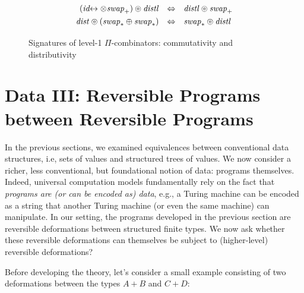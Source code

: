 \documentclass{article}
\newcommand{\swapp}{\mathit{swap}_+}
\newcommand{\swapt}{\mathit{swap}_*}
\newcommand{\dist}{\mathit{dist}}
\newcommand{\distl}{\mathit{distl}}
\newcommand{\idc}{\mathit{id}\!\!\leftrightarrow}
\begin{document}
\begin{figure}[t]
\[\def\arraystretch{1.3}
\begin{array}{rcl}
  (\idc \otimes \swapp) \circledcirc \distl &\Leftrightarrow& \distl \circledcirc \swapp
\\
  \dist \circledcirc (\swapt \oplus \swapt) &\Leftrightarrow & \swapt \circledcirc \distl
\end{array}\]
\caption{\label{figa}Signatures of level-1 $\Pi$-combinators: commutativity and distributivity}
\end{figure}

\section{Data III: Reversible Programs between Reversible Programs}

In the previous sections, we examined equivalences between
conventional data structures, i.e, sets of values and structured trees
of values. We now consider a richer, less conventional, but
foundational notion of data: programs themselves. Indeed, universal
computation models fundamentally rely on the fact that \emph{programs
  are (or can be encoded as) data}, e.g., a Turing machine can be
encoded as a string that another Turing machine (or even the same
machine) can manipulate. In our setting, the programs developed in the
previous section are reversible deformations between structured finite
types. We now ask whether these reversible deformations can themselves
be subject to (higher-level) reversible deformations?

Before developing the theory, let's consider a small example
consisting of two deformations between the types $A + B$ and $C+D$:
\end{document}
